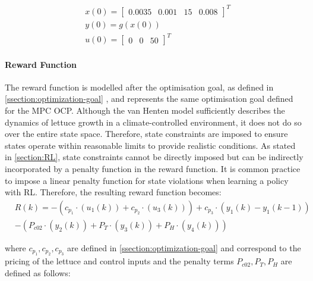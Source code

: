\begin{equation}
    \label{eq:init-conditions}
    \begin{aligned}
        &x(0) = \begin{bmatrix}
            0.0035&0.001&15&0.008
        \end{bmatrix}^T \\
        &y(0) = g(x(0)) \\
        &u(0) = \begin{bmatrix}
            0 & 0 & 50
        \end{bmatrix}^T
    \end{aligned}
\end{equation}

\paragraph{Reward Function}\label{paragraph:reward-function}
The reward function is modelled after the optimisation goal, as defined in \autoref{ssection:optimization-goal} , and represents the same optimisation goal defined for the MPC OCP. Although the van Henten model sufficiently describes the dynamics of lettuce growth in a climate-controlled environment, it does not do so over the entire state space. Therefore, state constraints are imposed to ensure states operate within reasonable limits to provide realistic conditions. As stated in \autoref{section:RL}, state constraints cannot be directly imposed but can be indirectly incorporated by a penalty function in the reward function. It is common practice to impose a linear penalty function for state violations when learning a policy with RL. Therefore, the resulting reward function becomes:
\begin{equation}\label{eq:reward_fn}
    \begin{aligned}
        & R(k)  =  - (c_{p_1} \cdot (u_1(k)) + c_{p_2} \cdot (u_3(k))) + c_{p_3} \cdot (y_1(k)- y_1(k-1))\\ 
        & - (P_{c02} \cdot (y_2(k) ) + P_T \cdot (y_3(k)) + P_H \cdot (y_4(k)) )
    \end{aligned}
\end{equation}

where $c_{p_1},c_{p_2},c_{p_3}$ are defined in \autoref{ssection:optimization-goal} and correspond to the pricing of the lettuce and control inputs and the penalty terms $P_{c02},P_T,P_H$ are defined as follows:

